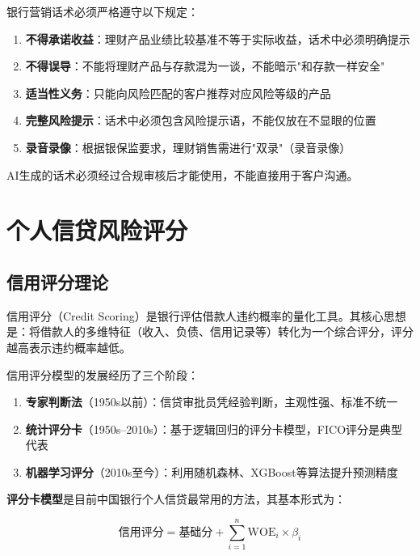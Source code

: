 \begin{warningbox}
银行营销话术必须严格遵守以下规定：
\begin{enumerate}[leftmargin=1em]
  \item \textbf{不得承诺收益}：理财产品业绩比较基准不等于实际收益，话术中必须明确提示
  \item \textbf{不得误导}：不能将理财产品与存款混为一谈，不能暗示"和存款一样安全"
  \item \textbf{适当性义务}：只能向风险匹配的客户推荐对应风险等级的产品
  \item \textbf{完整风险提示}：话术中必须包含风险提示语，不能仅放在不显眼的位置
  \item \textbf{录音录像}：根据银保监要求，理财销售需进行"双录"（录音录像）
\end{enumerate}
AI生成的话术必须经过合规审核后才能使用，不能直接用于客户沟通。
\end{warningbox}

\section{个人信贷风险评分}

\subsection{信用评分理论}

信用评分（Credit Scoring）是银行评估借款人违约概率的量化工具。其核心思想是：将借款人的多维特征（收入、负债、信用记录等）转化为一个综合评分，评分越高表示违约概率越低。

信用评分模型的发展经历了三个阶段：

\begin{enumerate}[leftmargin=2em]
  \item \textbf{专家判断法}（1950s以前）：信贷审批员凭经验判断，主观性强、标准不统一
  \item \textbf{统计评分卡}（1950s--2010s）：基于逻辑回归的评分卡模型，FICO评分是典型代表
  \item \textbf{机器学习评分}（2010s至今）：利用随机森林、XGBoost等算法提升预测精度
\end{enumerate}

\textbf{评分卡模型}是目前中国银行个人信贷最常用的方法，其基本形式为：

\[
\text{信用评分} = \text{基础分} + \sum_{i=1}^{n} \text{WOE}_i \times \beta_i
\]

